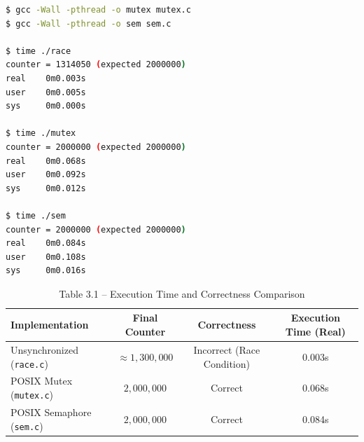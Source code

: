 \documentclass[12pt,a4paper]{report}
\numberwithin{equation}{chapter}
\numberwithin{figure}{chapter}
\numberwithin{table}{chapter}
\begin{document}
\begin{lstlisting}[language=bash]
$ gcc -Wall -pthread -o mutex mutex.c
$ gcc -Wall -pthread -o sem sem.c

$ time ./race
counter = 1314050 (expected 2000000)
real    0m0.003s
user    0m0.005s
sys     0m0.000s

$ time ./mutex
counter = 2000000 (expected 2000000)
real    0m0.068s
user    0m0.092s
sys     0m0.012s

$ time ./sem
counter = 2000000 (expected 2000000)
real    0m0.084s
user    0m0.108s
sys     0m0.016s
\end{lstlisting}

\begin{table}[H]
\centering
\caption{Table 3.1 -- Execution Time and Correctness Comparison}
\begin{tabular}{lccc}
\toprule
\textbf{Implementation} & \textbf{Final Counter} & \textbf{Correctness} & \textbf{Execution Time (Real)} \\
\midrule
Unsynchronized (\texttt{race.c}) & $\approx 1{,}300{,}000$ & Incorrect (Race Condition) & 0.003s \\
POSIX Mutex (\texttt{mutex.c}) & $2{,}000{,}000$ & Correct & 0.068s \\
POSIX Semaphore (\texttt{sem.c}) & $2{,}000{,}000$ & Correct & 0.084s \\
\bottomrule
\end{tabular}
\end{table}
\end{document}
